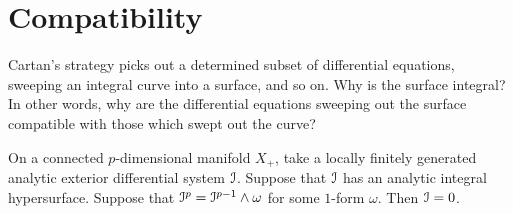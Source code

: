 \section{Compatibility}
Cartan's strategy picks out a determined subset of differential equations,
sweeping an integral curve into a surface, and so on.
Why is the surface integral?
In other words, why are the differential equations sweeping out the surface compatible with those which swept out the curve?
\begin{lemma}\label{lemma:domino}
On a connected \(p\)-dimensional manifold \(X_+\), take a locally finitely generated analytic exterior differential system \(\mathcal{I}\).
Suppose that \(\mathcal{I}\) has an analytic integral hypersurface.
Suppose that \(\mathcal{I}^p=\mathcal{I}^{p-1}\wedge\omega\) for some \(1\)-form \(\omega\).
Then \(\mathcal{I}=0\).
\end{lemma}
